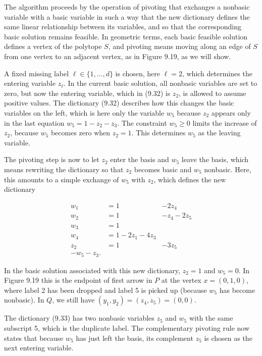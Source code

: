 \documentclass[12pt]{article}
\begin{document}
The algorithm proceeds by the operation of pivoting that exchanges a nonbasic variable with a basic variable in such a way that the new dictionary defines the same linear relationship between its variables, and so that the corresponding basic solution remains feasible. In geometric terms, each basic feasible solution defines a vertex of the polytope $S$, and pivoting means moving along an edge of $S$ from one vertex to an adjacent vertex, as in Figure 9.19, as we will show.

A fixed missing label $\ell \in\{1, \ldots, d\}$ is chosen, here $\ell=2$, which determines the entering variable $z_{\ell}$. In the current basic solution, all nonbasic variables are set to zero, but now the entering variable, which in (9.32) is $z_{2}$, is allowed to assume positive values. The dictionary (9.32) describes how this changes the basic variables on the left, which is here only the variable $w_{5}$ because $z_{2}$ appears only in the last equation $w_{5}=1-z_{2}-z_{3}$. The constraint $w_{5} \geq 0$ limits the increase of $z_{2}$, because $w_{5}$ becomes zero when $z_{2}=1$. This determines $w_{5}$ as the leaving variable.

The pivoting step is now to let $z_{2}$ enter the basis and $w_{5}$ leave the basis, which means rewriting the dictionary so that $z_{2}$ becomes basic and $w_{5}$ nonbasic. Here, this amounts to a simple exchange of $w_{5}$ with $z_{2}$, which defines the new dictionary

\[
\begin{array}{rlr}
w_{1} & =1 & -2 z_{4} \\
w_{2} & =1 & -z_{4}-2 z_{5} \\
w_{3} & =1 &  \tag{9.33}\\
w_{4} & =1-2 z_{1}-4 z_{3} & \\
z_{2} & =1 & -3 z_{5} \\
-w_{5}-z_{3} . &
\end{array}
\]

In the basic solution associated with this new dictionary, $z_{2}=1$ and $w_{5}=0$. In Figure 9.19 this is the endpoint of first arrow in $P$ at the vertex $x=(0,1,0)$, where label 2 has been dropped and label 5 is picked up (because $w_{5}$ has become nonbasic). In $Q$, we still have $\left(y_{1}, y_{2}\right)=\left(z_{4}, z_{5}\right)=(0,0)$.

The dictionary (9.33) has two nonbasic variables $z_{5}$ and $w_{5}$ with the same subscript 5, which is the duplicate label. The complementary pivoting rule now states that because $w_{5}$ has just left the basis, its complement $z_{5}$ is chosen as the next entering variable.
\end{document}
